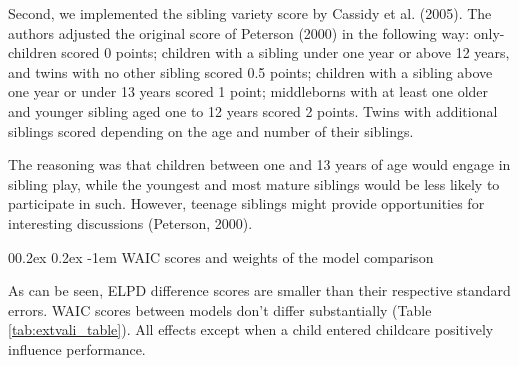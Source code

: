\documentclass[
  man,floatsintext]{apa6}
\makeatletter
\let\oldparagraph\paragraph
\renewcommand{\paragraph}[1]{\oldparagraph{#1}\mbox{}}
\renewcommand{\paragraph}{\@startsection{paragraph}{4}{\parindent}%
  {0\baselineskip \@plus 0.2ex \@minus 0.2ex}%
  {-1em}%
  {\normalfont\normalsize\bfseries\itshape\typesectitle}}
\makeatother
\begin{document}
Second, we implemented the sibling variety score by Cassidy et al. (2005). The authors adjusted the original score of Peterson (2000) in the following way: only-children scored 0 points; children with a sibling under one year or above 12 years, and twins with no other sibling scored 0.5 points; children with a sibling above one year or under 13 years scored 1 point; middleborns with at least one older and younger sibling aged one to 12 years scored 2 points. Twins with additional siblings scored depending on the age and number of their siblings.

The reasoning was that children between one and 13 years of age would engage in sibling play, while the youngest and most mature siblings would be less likely to participate in such. However, teenage siblings might provide opportunities for interesting discussions (Peterson, 2000).

\hypertarget{waic-scores-and-weights-of-the-model-comparison}{%
\paragraph{WAIC scores and weights of the model comparison}\label{waic-scores-and-weights-of-the-model-comparison}}

As can be seen, ELPD difference scores are smaller than their respective standard errors. WAIC scores between models don't differ substantially (Table \ref{tab:extvali_table}). All effects except when a child entered childcare positively influence performance.
\end{document}

